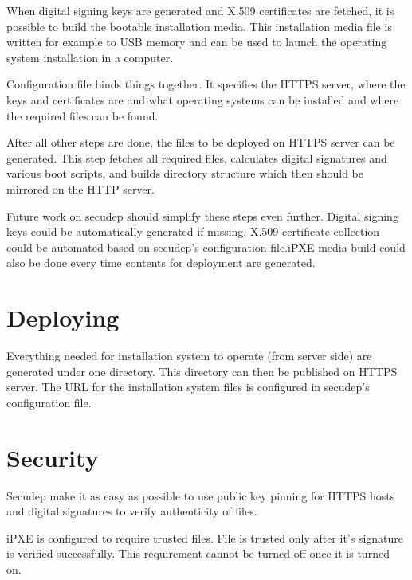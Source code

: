 When digital signing keys are generated and X.509 certificates are
fetched, it is possible to build the bootable installation media. This
installation media file is written for example to USB memory and can
be used to launch the operating system installation in a computer.

Configuration file binds things together. It specifies the HTTPS
server, where the keys and certificates are and what operating systems
can be installed and where the required files can be found.

After all other steps are done, the files to be deployed on HTTPS
server can be generated. This step fetches all required files,
calculates digital signatures and various boot scripts, and builds
directory structure which then should be mirrored on the HTTP server.

Future work on secudep should simplify these steps even further.
Digital signing keys could be automatically generated if missing,
X.509 certificate collection could be automated based on secudep's
configuration file.\@ iPXE media build could also be done every time
contents for deployment are generated.

\section{Deploying}


Everything needed for installation system to operate (from server
side) are generated under one directory. This directory can then be
published on HTTPS server. The URL for the installation system files
is configured in secudep's configuration file.

\section{Security}

Secudep make it as easy as possible to use public key pinning for
HTTPS hosts and digital signatures to verify authenticity of files.

iPXE is configured to require trusted files. File is trusted only
after it's signature is verified successfully. This requirement
cannot be turned off once it is turned on.
